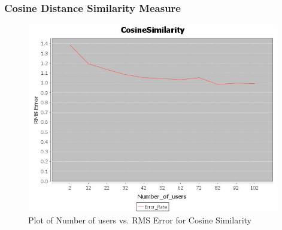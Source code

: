 \documentclass{article}
\begin{document}
\subsubsection{Cosine Distance Similarity Measure}
\begin{figure}[h!tb]
\centering
\includegraphics[width=11cm]{3.jpg}
\caption {Plot of Number of users vs. RMS Error for Cosine Similarity}
\end{figure}
\newpage
\end{document}
